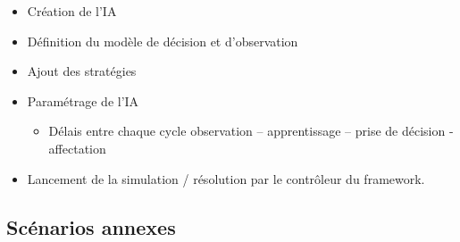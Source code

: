 \begin{itemize}
\item Création de l'IA
\item Définition du modèle de décision et d'observation
\item Ajout des stratégies
\item Paramétrage de l'IA
	\begin{itemize}
	\item Délais entre chaque cycle \og observation – apprentissage – prise de décision - affectation \fg
	\end{itemize}
\item Lancement de la simulation / résolution par le contrôleur du framework.
\end{itemize} %


\subsection{Scénarios annexes}

